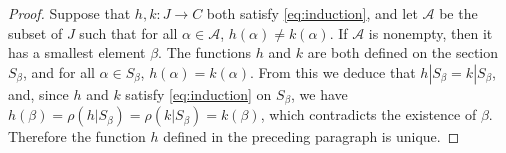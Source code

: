 \documentclass[11pt,a4paper,twoside]{article}
\theoremstyle{definition}
\theoremstyle{plain}
\begin{document}
\begin{proof}
Suppose that $h, k : J \to C$ both satisfy \eqref{eq:induction}, and let $\mathscr{A}$ be the subset of $J$ such that
for all $\alpha \in \mathscr{A}$, $h ( \alpha ) \neq k ( \alpha )$. If $\mathscr{A}$ is nonempty, then it has a smallest element $\beta$.
The functions $h$ and $k$ are both defined on the section $S_\beta$, and for all $\alpha \in S_\beta$, $h ( \alpha ) = k ( \alpha )$.
From this we deduce that $h | S_\beta = k | S_\beta$, and, since $h$ and $k$ satisfy \eqref{eq:induction} on $S_\beta$, we have
$h ( \beta ) = \rho ( h | S_\beta ) = \rho ( k | S_\beta ) = k ( \beta )$, which contradicts the existence of $\beta$.
Therefore the function $h$ defined in the preceding paragraph is unique.

\end{proof}
\end{document}
